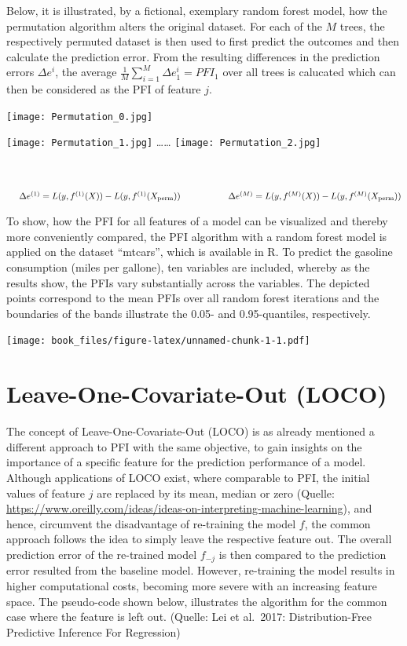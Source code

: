 \documentclass[
]{krantz}
\begin{document}
Below, it is illustrated, by a fictional, exemplary random forest model, how the permutation algorithm alters the original dataset. For each of the \(M\) trees, the respectively permuted dataset is then used to first predict the outcomes and then calculate the prediction error. From the resulting differences in the prediction errors \(\Delta e^{i}\), the average \(\frac{1}{M}\sum_{i=1}^{M} \Delta e_{1}^{i} = PFI_{1}\) over all trees is calucated which can then be considered as the PFI of feature \(j\).

\texttt{[image: Permutation\_0.jpg]}

\texttt{[image: Permutation\_1.jpg]}
\ldots{}\ldots{}
\texttt{[image: Permutation\_2.jpg]}

~

\(\hspace{0.5cm}\Delta e^{(1)} = L(y,f^{(1)}(X))- L(y,f^{(1)}(X_{\text{perm}}))\hspace{1.9cm}\Delta e^{(M)} = L(y,f^{(M)}(X))- L(y,f^{(M)}(X_{\text{perm}}))\)

To show, how the PFI for all features of a model can be visualized and thereby more conveniently compared, the PFI algorithm with a random forest model is applied on the dataset ``mtcars'', which is available in R. To predict the gasoline consumption (miles per gallone), ten variables are included, whereby as the results show, the PFIs vary substantially across the variables. The depicted points correspond to the mean PFIs over all random forest iterations and the boundaries of the bands illustrate the 0.05- and 0.95-quantiles, respectively.

\texttt{[image: book\_files/figure-latex/unnamed-chunk-1-1.pdf]}

\hypertarget{leave-one-covariate-out-loco}{%
\section{Leave-One-Covariate-Out (LOCO)}\label{leave-one-covariate-out-loco}}

The concept of Leave-One-Covariate-Out (LOCO) is as already mentioned a different approach to PFI with the same objective, to gain insights on the importance of a specific feature for the prediction performance of a model. Although applications of LOCO exist, where comparable to PFI, the initial values of feature \(j\) are replaced by its mean, median or zero (Quelle: \url{https://www.oreilly.com/ideas/ideas-on-interpreting-machine-learning}), and hence, circumvent the disadvantage of re-training the model \(f\), the common approach follows the idea to simply leave the respective feature out. The overall prediction error of the re-trained model \(f_{-j}\) is then compared to the prediction error resulted from the baseline model. However, re-training the model results in higher computational costs, becoming more severe with an increasing feature space. The pseudo-code shown below, illustrates the algorithm for the common case where the feature is left out. (Quelle: Lei et al.~2017: Distribution-Free Predictive Inference For Regression)
\end{document}
